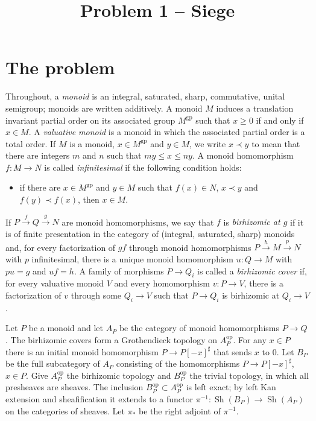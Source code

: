 \documentclass[11pt]{article}
\title{Problem 1 -- Siege}
\author{}
\date{}
\theoremstyle{definition}
\theoremstyle{remark}
\newcommand{\gp}{\mathrm{gp}}
\newcommand{\Sh}{\operatorname{Sh}}
\begin{document}
\maketitle

\section{The problem}

Throughout, a \emph{monoid} is an integral, saturated, sharp, commutative, unital semigroup; monoids are written additively. A monoid $M$ induces a translation invariant partial order on its associated group $M^{\gp}$ such that $x\ge 0$ if and only if $x\in M$. A \emph{valuative monoid} is a monoid in which the associated partial order is a total order. If $M$ is a monoid, $x\in M^{\gp}$ and $y\in M$, we write $x\prec y$ to mean that there are integers $m$ and $n$ such that $my\le x\le ny$. A monoid homomorphism $f\colon M\to N$ is called \emph{infinitesimal} if the following condition holds:
\begin{itemize}
\item if there are $x\in M^{\gp}$ and $y\in M$ such that $f(x)\in N$, $x\prec y$ and $f(y)\prec f(x)$, then $x\in M$.
\end{itemize}
If $P\xrightarrow{f}Q\xrightarrow{g}N$ are monoid homomorphisms, we say that $f$ is \emph{birhizomic at $g$} if it is of finite presentation in the category of (integral, saturated, sharp) monoids and, for every factorization of $gf$ through monoid homomorphisms $P\xrightarrow{h}M\xrightarrow{p}N$ with $p$ infinitesimal, there is a unique monoid homomorphism $u\colon Q\to M$ with $pu=g$ and $uf=h$. A family of morphisms $P\to Q_i$ is called a \emph{birhizomic cover} if, for every valuative monoid $V$ and every homomorphism $v\colon P\to V$, there is a factorization of $v$ through some $Q_i\to V$ such that $P\to Q_i$ is birhizomic at $Q_i\to V$.

Let $P$ be a monoid and let $A_P$ be the category of monoid homomorphisms $P\to Q$. The birhizomic covers form a Grothendieck topology on $A_P^{\mathrm{op}}$. For any $x\in P$ there is an initial monoid homomorphism $P\to P[-x]^\sharp$ that sends $x$ to $0$. Let $B_P$ be the full subcategory of $A_P$ consisting of the homomorphisms $P\to P[-x]^\sharp$, $x\in P$. Give $A_P^{\mathrm{op}}$ the birhizomic topology and $B_P^{\mathrm{op}}$ the trivial topology, in which all presheaves are sheaves. The inclusion $B_P^{\mathrm{op}}\subset A_P^{\mathrm{op}}$ is left exact; by left Kan extension and sheafification it extends to a functor $\pi^{-1}\colon \Sh(B_P)\to\Sh(A_P)$ on the categories of sheaves. Let $\pi_*$ be the right adjoint of $\pi^{-1}$.
\end{document}
